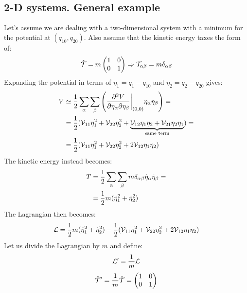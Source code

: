\subsection{2-D systems. General example}
Let's assume we are dealing with a two-dimensional system with a minimum for the potential at $(q_{10},q_{20})$. Also assume that the kinetic energy taxes the form of:
\begin{equation}
    \hat{\mathcal{T}} = m\begin{pmatrix}
        1 & 0\\
        0 & 1
    \end{pmatrix} \Rightarrow \mathcal{T}_{\alpha \beta} = m\delta_{\alpha \beta}
\end{equation}
Expanding the potential in terms of $\eta_1 = q_1-q_{10}$ and $\eta_2 = q_2-q_{20}$ gives:
\begin{equation}
    \begin{split}
        V &\simeq \dfrac{1}{2}\displaystyle\sum_{\alpha}\displaystyle\sum_{\beta}\left(\dfrac{\partial^2 V}{\partial \eta_{\alpha} \partial \eta_{\beta}}\bigg|_{(0,0)}\eta_{\alpha}\eta_{\beta}\right) =\\
        &= \dfrac{1}{2}(\mathcal{V}_{11}\eta_1^2 + \mathcal{V}_{22}\eta_2^2 + \underbrace{\mathcal{V}_{12}\eta_1\eta_2 + \mathcal{V}_{21}\eta_2\eta_1}_{\text{same term}}) =\\
        &= \dfrac{1}{2}(\mathcal{V}_{11}\eta_1^2 + \mathcal{V}_{22}\eta_2^2 + 2\mathcal{V}_{12}\eta_1\eta_2 )
    \end{split}
\end{equation}
The kinetic energy instead becomes:
\begin{equation}
    \begin{split}
        T &= \dfrac{1}{2}\displaystyle\sum_{\alpha}\displaystyle\sum_{\beta}m \delta_{\alpha \beta} \dot{\eta}_{\alpha}\dot{\eta}_{\beta} =\\
        &= \dfrac{1}{2}m(\dot{\eta}_1^2 + \dot{\eta}_2^2)
    \end{split}
\end{equation}
The Lagrangian then becomes:
\begin{equation}
    \mathcal{L} = \dfrac{1}{2}m(\dot{\eta}_1^2 + \dot{\eta}_2^2) - \dfrac{1}{2}(\mathcal{V}_{11}\eta_1^2 + \mathcal{V}_{22}\eta_2^2 + 2\mathcal{V}_{12}\eta_1\eta_2 )
\end{equation}
Let us divide the Lagrangian by $m$ and define:
\begin{equation}
    \mathcal{L}' = \dfrac{1}{m}\mathcal{L}
\end{equation}
\begin{equation}
    \hat{\mathcal{T}}' = \dfrac{1}{m}\hat{\mathcal{T}} = \begin{pmatrix}
        1 & 0\\
        0 & 1
    \end{pmatrix}
\end{equation}
